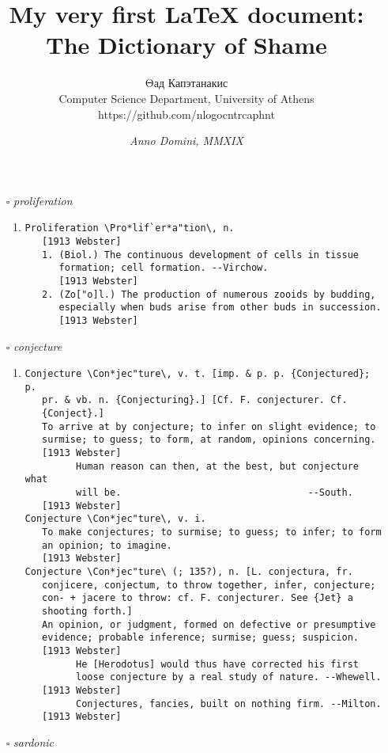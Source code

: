 \documentclass{article}
\author{Θад Капэтанакис\\ {\small Computer Science Department, University of Athens}\\ {\tiny https://github.com/nlogocntrcaphnt}}
\title{My very first {\LaTeX} document: The Dictionary of Shame}
\date{\textit{Anno Domini, MMXIX}}
\begin{document}
	\maketitle
	\renewcommand{\labelenumi}{\Roman{enumi}}
	\begin{itemize}

\item[$\square$] \emph{ proliferation }
\begin{enumerate}
\item{
\begin{lstlisting}
Proliferation \Pro*lif`er*a"tion\, n.
   [1913 Webster]
   1. (Biol.) The continuous development of cells in tissue
      formation; cell formation. --Virchow.
      [1913 Webster]
   2. (Zo["o]l.) The production of numerous zooids by budding,
      especially when buds arise from other buds in succession.
      [1913 Webster]
\end{lstlisting}}
\end{enumerate}
\item[$\square$] \emph{ conjecture }
\begin{enumerate}
\item{
\begin{lstlisting}
Conjecture \Con*jec"ture\, v. t. [imp. & p. p. {Conjectured}; p.
   pr. & vb. n. {Conjecturing}.] [Cf. F. conjecturer. Cf.
   {Conject}.]
   To arrive at by conjecture; to infer on slight evidence; to
   surmise; to guess; to form, at random, opinions concerning.
   [1913 Webster]
         Human reason can then, at the best, but conjecture what
         will be.                                 --South.
   [1913 Webster]
Conjecture \Con*jec"ture\, v. i.
   To make conjectures; to surmise; to guess; to infer; to form
   an opinion; to imagine.
   [1913 Webster]
Conjecture \Con*jec"ture\ (; 135?), n. [L. conjectura, fr.
   conjicere, conjectum, to throw together, infer, conjecture;
   con- + jacere to throw: cf. F. conjecturer. See {Jet} a
   shooting forth.]
   An opinion, or judgment, formed on defective or presumptive
   evidence; probable inference; surmise; guess; suspicion.
   [1913 Webster]
         He [Herodotus] would thus have corrected his first
         loose conjecture by a real study of nature. --Whewell.
   [1913 Webster]
         Conjectures, fancies, built on nothing firm. --Milton.
   [1913 Webster]
\end{lstlisting}}
\end{enumerate}
\item[$\square$] \emph{ sardonic }

\end{itemize}
\end{document}
